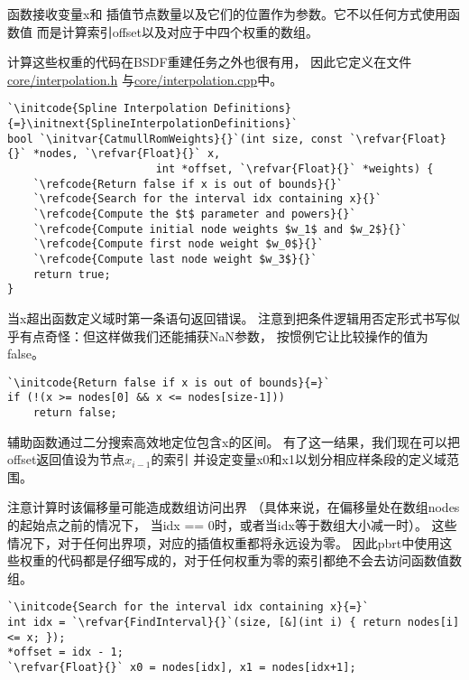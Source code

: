 函数接收变量{\ttfamily x}和
插值节点数量以及它们的位置作为参数。它不以任何方式使用函数值
而是计算索引{\ttfamily offset}以及对应于中四个权重的数组。

计算这些权重的代码在BSDF重建任务之外也很有用，
因此它定义在文件\href{https://github.com/mmp/pbrt-v3/blob/master/src/core/interpolation.h}{\ttfamily core/interpolation.h}
与\href{https://github.com/mmp/pbrt-v3/blob/master/src/core/interpolation.cpp}{\ttfamily core/interpolation.cpp}中。
\begin{lstlisting}
`\initcode{Spline Interpolation Definitions}{=}\initnext{SplineInterpolationDefinitions}`
bool `\initvar{CatmullRomWeights}{}`(int size, const `\refvar{Float}{}` *nodes, `\refvar{Float}{}` x,
                       int *offset, `\refvar{Float}{}` *weights) {
    `\refcode{Return false if x is out of bounds}{}`
    `\refcode{Search for the interval idx containing x}{}`
    `\refcode{Compute the $t$ parameter and powers}{}`
    `\refcode{Compute initial node weights $w_1$ and $w_2$}{}`
    `\refcode{Compute first node weight $w_0$}{}`
    `\refcode{Compute last node weight $w_3$}{}`
    return true;
}
\end{lstlisting}
当{\ttfamily x}超出函数定义域时第一条语句返回错误。
注意到把条件逻辑用否定形式书写似乎有点奇怪：但这样做我们还能捕获NaN参数，
按惯例它让比较操作的值为{\ttfamily false}。
\begin{lstlisting}
`\initcode{Return false if x is out of bounds}{=}`
if (!(x >= nodes[0] && x <= nodes[size-1]))
    return false;
\end{lstlisting}

辅助函数通过二分搜索高效地定位包含{\ttfamily x}的区间。
有了这一结果，我们现在可以把{\ttfamily *offset}返回值设为节点$x_{i-1}$的索引
并设定变量{\ttfamily x0}和{\ttfamily x1}以划分相应样条段的定义域范围。

注意计算时该偏移量可能造成数组访问出界
（具体来说，在偏移量处在数组{\ttfamily nodes}的起始点之前的情况下，
当{\ttfamily idx == 0}时，或者当{\ttfamily idx}等于数组大小减一时）。
这些情况下，对于任何出界项，对应的插值权重都将永远设为零。
因此pbrt中使用这些权重的代码都是仔细写成的，对于任何权重为零的索引都绝不会去访问函数值数组。
\begin{lstlisting}
`\initcode{Search for the interval idx containing x}{=}`
int idx = `\refvar{FindInterval}{}`(size, [&](int i) { return nodes[i] <= x; });
*offset = idx - 1;
`\refvar{Float}{}` x0 = nodes[idx], x1 = nodes[idx+1];
\end{lstlisting}


